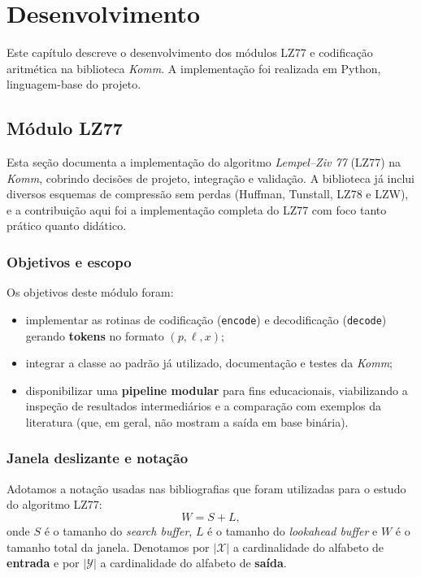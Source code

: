 \chapter{Desenvolvimento}\label{cap:desenvolvimento}

Este capítulo descreve o desenvolvimento dos módulos LZ77 e codificação
aritmética na biblioteca \textit{Komm}. A implementação foi realizada em
Python, linguagem-base do projeto.

\section{Módulo LZ77}

Esta seção documenta a implementação do algoritmo \textit{Lempel–Ziv 77} (LZ77)
na \textit{Komm}, cobrindo decisões de projeto, integração e validação. A
biblioteca já inclui diversos esquemas de compressão sem perdas (Huffman,
Tunstall, LZ78 e LZW), e a contribuição aqui foi a implementação completa do
LZ77 com foco tanto prático quanto didático.

\subsection{Objetivos e escopo}

Os objetivos deste módulo foram:
\begin{itemize}
    \item implementar as rotinas de codificação (\texttt{encode}) e decodificação
          (\texttt{decode}) gerando \textbf{tokens} no formato \((p,\ell,x)\);
    \item integrar a classe ao padrão já utilizado, documentação e testes da \textit{Komm};
    \item disponibilizar uma \textbf{pipeline modular} para fins educacionais,
          viabilizando a inspeção de resultados intermediários e a comparação com
          exemplos da literatura (que, em geral, não mostram a saída em base binária).
\end{itemize}

\subsection{Janela deslizante e notação}\label{subsec:janela-notacao}

Adotamos a notação usadas nas bibliografias que foram utilizadas para o estudo do algoritmo LZ77:
\[
    W = S + L,
\]
onde \(S\) é o tamanho do \emph{search buffer}, \(L\) é o tamanho do
\emph{lookahead buffer} e \(W\) é o tamanho total da janela. Denotamos por \(
|\mathcal{X}| \) a cardinalidade do alfabeto de \textbf{entrada} e por \(
|\mathcal{Y}| \) a cardinalidade do alfabeto de \textbf{saída}.

